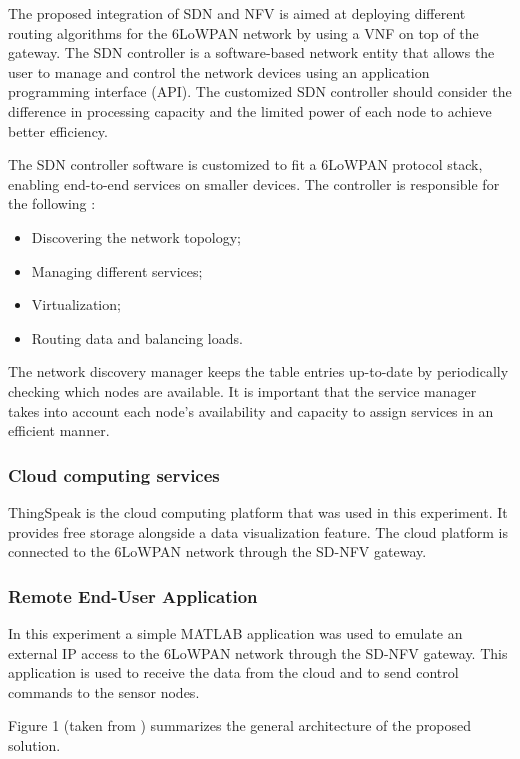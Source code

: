 \documentclass[10pt,journal,compsoc]{IEEEtran}
\begin{document}
The proposed integration of SDN and NFV is aimed at deploying different 
routing algorithms for the 6LoWPAN network by using a VNF on top of 
the gateway. The SDN controller is a software-based network entity 
that allows the user to manage and control the network devices using 
an application programming interface (API). The customized SDN controller 
should consider the difference in processing capacity and the limited 
power of each node to achieve better efficiency. 

The SDN controller software is customized to fit a 6LoWPAN protocol stack, 
enabling end-to-end services on smaller devices. The controller is 
responsible for the following :

\begin{itemize}
    \item Discovering the network topology;
    \item Managing different services;
    \item Virtualization;
    \item Routing data and balancing loads.
\end{itemize}

The network discovery manager keeps the table entries up-to-date 
by periodically checking which nodes are available. It is important that 
the service manager takes into account each node's availability and 
capacity to assign services in an efficient manner.

\subsubsection{Cloud computing services}

ThingSpeak \cite{thingspeak} is the cloud computing platform that was 
used in this experiment. It provides free storage alongside a data 
visualization feature. The cloud platform is connected to the 6LoWPAN 
network through the SD-NFV gateway. 

\subsubsection{Remote End-User Application}

In this experiment a simple MATLAB application was used to 
emulate an external IP access to the 6LoWPAN network through the 
SD-NFV gateway. This application is used to receive the data from the 
cloud and to send control commands to the sensor nodes.

Figure 1 (taken from \cite{main}) summarizes the general architecture 
of the proposed solution.
\end{document}

